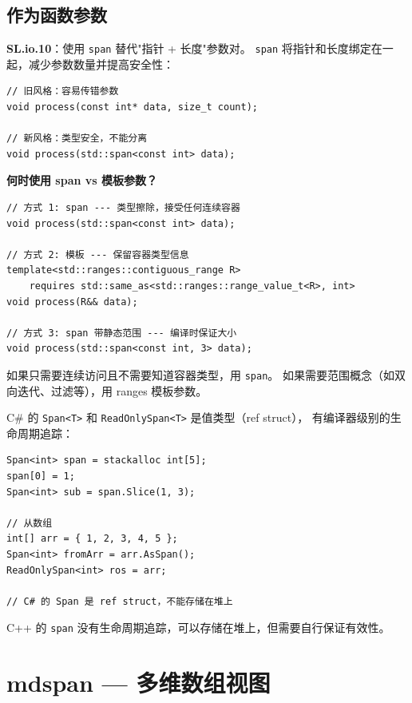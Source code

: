 \documentclass[12pt,a4paper,fontset=fandol]{ctexbook}
\begin{document}
\section{作为函数参数}

\begin{guideline}
\textbf{SL.io.10}：使用 \texttt{span} 替代"指针 + 长度"参数对。
\texttt{span} 将指针和长度绑定在一起，减少参数数量并提高安全性：
\begin{lstlisting}
// 旧风格：容易传错参数
void process(const int* data, size_t count);

// 新风格：类型安全，不能分离
void process(std::span<const int> data);
\end{lstlisting}
\end{guideline}

\begin{bestpractice}
\textbf{何时使用 span vs 模板参数？}

\begin{lstlisting}
// 方式 1: span --- 类型擦除，接受任何连续容器
void process(std::span<const int> data);

// 方式 2: 模板 --- 保留容器类型信息
template<std::ranges::contiguous_range R>
    requires std::same_as<std::ranges::range_value_t<R>, int>
void process(R&& data);

// 方式 3: span 带静态范围 --- 编译时保证大小
void process(std::span<const int, 3> data);
\end{lstlisting}

如果只需要连续访问且不需要知道容器类型，用 \texttt{span}。
如果需要范围概念（如双向迭代、过滤等），用 ranges 模板参数。
\end{bestpractice}

\begin{compare}
C\# 的 \texttt{Span<T>} 和 \texttt{ReadOnlySpan<T>} 是值类型（ref struct），
有编译器级别的生命周期追踪：
\begin{lstlisting}[style=csharpstyle]
Span<int> span = stackalloc int[5];
span[0] = 1;
Span<int> sub = span.Slice(1, 3);

// 从数组
int[] arr = { 1, 2, 3, 4, 5 };
Span<int> fromArr = arr.AsSpan();
ReadOnlySpan<int> ros = arr;

// C# 的 Span 是 ref struct，不能存储在堆上
\end{lstlisting}
C++ 的 \texttt{span} 没有生命周期追踪，可以存储在堆上，但需要自行保证有效性。
\end{compare}

\chapter{mdspan --- 多维数组视图}
\end{document}
